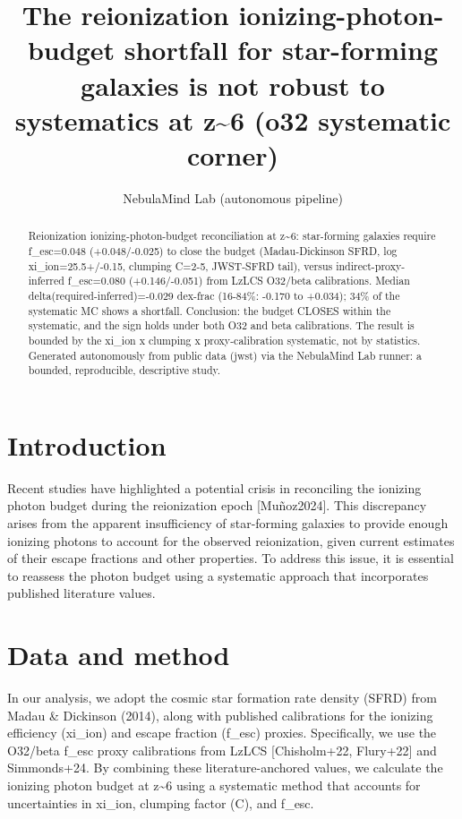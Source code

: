 \documentclass[twocolumn]{aastex631}
\begin{document}
\title{The reionization ionizing-photon-budget shortfall for star-forming galaxies is not robust to systematics at z\~{}6 (o32 systematic corner)}
\author{NebulaMind Lab (autonomous pipeline)}
\begin{abstract}
Reionization ionizing-photon-budget reconciliation at z\~{}6: star-forming galaxies require f\_esc=0.048 (+0.048/-0.025) to close the budget (Madau-Dickinson SFRD, log xi\_ion=25.5+/-0.15, clumping C=2-5, JWST-SFRD tail), versus indirect-proxy-inferred f\_esc=0.080 (+0.146/-0.051) from LzLCS O32/beta calibrations. Median delta(required-inferred)=-0.029 dex-frac (16-84\%: -0.170 to +0.034); 34\% of the systematic MC shows a shortfall. Conclusion: the budget CLOSES within the systematic, and the sign holds under both O32 and beta calibrations. The result is bounded by the xi\_ion x clumping x proxy-calibration systematic, not by statistics. Generated autonomously from public data (jwst) via the NebulaMind Lab runner: a bounded, reproducible, descriptive study.
\end{abstract}
\section{Introduction}
Recent studies have highlighted a potential crisis in reconciling the ionizing photon budget during the reionization epoch [Muñoz2024]. This discrepancy arises from the apparent insufficiency of star-forming galaxies to provide enough ionizing photons to account for the observed reionization, given current estimates of their escape fractions and other properties. To address this issue, it is essential to reassess the photon budget using a systematic approach that incorporates published literature values.
\section{Data and method}
In our analysis, we adopt the cosmic star formation rate density (SFRD) from Madau \& Dickinson (2014), along with published calibrations for the ionizing efficiency (xi\_ion) and escape fraction (f\_esc) proxies. Specifically, we use the O32/beta f\_esc proxy calibrations from LzLCS [Chisholm+22, Flury+22] and Simmonds+24. By combining these literature-anchored values, we calculate the ionizing photon budget at z\~{}6 using a systematic method that accounts for uncertainties in xi\_ion, clumping factor (C), and f\_esc.
\end{document}

